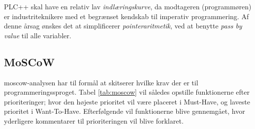 \noindent PLC++ skal have en relativ lav \textit{indlæringskurve}, da modtageren (programmøren) er industriteknikere med et begrænset kendskab til imperativ programmering. Af denne årsag ønskes det at simplificerer \textit{pointeraritmetik}, ved at benytte \textit{pass by value} til alle variabler. 

\subsection{MoSCoW}
\gls{moscow}-analysen har til formål at skitserer hvilke krav der er til programmeringssproget. Tabel \ref{tab:moscow} vil således opstille funktionerne efter prioriteringer; hvor den højeste prioritet vil være placeret i Must-Have, og laveste prioritet i Want-To-Have. Efterfølgende vil funktionerne blive gennemgået, hvor yderligere kommentarer til prioriteringen vil blive forklaret.

